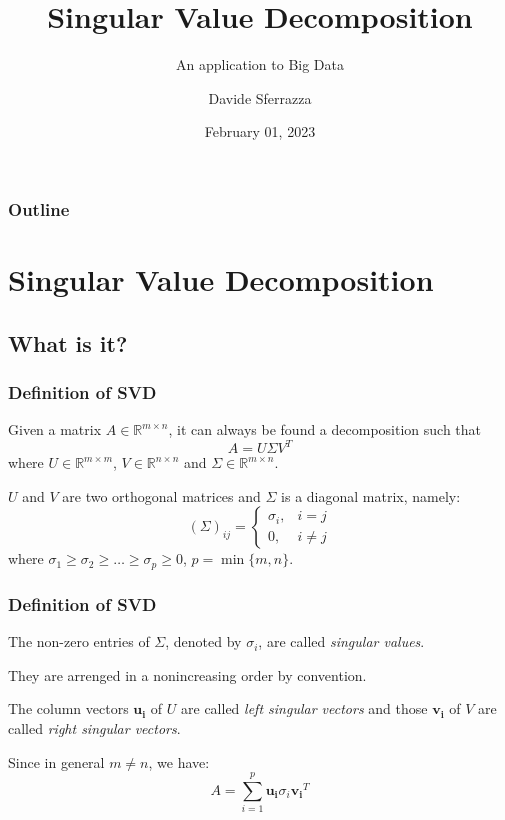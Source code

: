\documentclass[10pt]{beamer}
\title{Singular Value Decomposition}
\subtitle{An application to Big Data}
\author{Davide Sferrazza}
\institute{Università degli Studi di Palermo}
\date{February 01, 2023}
\begin{document}
\maketitle

\begin{frame}
    \frametitle{Outline}
    \tableofcontents
\end{frame}

\section{Singular Value Decomposition}
\subsection{What is it?}

\begin{frame}
    \frametitle{Definition of SVD}
    \begin{theorem}
        Given a matrix $A \in \mathbb{R}^{m \times n}$, it can always be found a decomposition such that
        \begin{equation}
            \label{eq:SVD}
            A = U \Sigma V^T
        \end{equation}
        where $U \in \mathbb{R}^{m \times m}$, $V \in \mathbb{R}^{n \times n}$ and $\Sigma \in \mathbb{R}^{m \times n}$.

        $U$ and $V$ are two orthogonal matrices and $\Sigma$ is a diagonal matrix, namely:
        $$ ( \Sigma )_{ij} = 
            \begin{cases}
                \sigma_i, & i = j \\
                0, & i \ne j 
            \end{cases} 
        $$
        where $\sigma_1 \ge \sigma_2 \ge \ldots  \ge \sigma_p \ge 0$, $p = \min\{m, n\}$.
    \end{theorem}
\end{frame}

\begin{frame}
    \frametitle{Definition of SVD}
    The non-zero entries of $\Sigma$, denoted by $\sigma_i$, are called \textit{singular values}.

    They are arrenged in a nonincreasing order by convention.

    The column vectors $\bm{u_i}$ of $U$ are called \textit{left singular vectors} and those $\bm{v_i}$ of $V$ are called \textit{right singular vectors}. \bigskip
    
    Since in general $m \ne n$, we have: 
    $$ A = \sum_{i = 1}^{p} \bm{u_i} \sigma_i \bm{v_i}^T $$

\end{frame}
\end{document}
